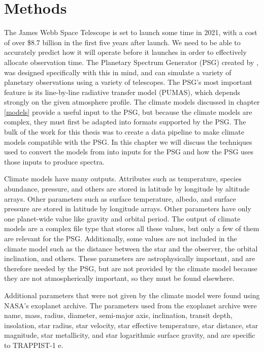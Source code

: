 \chapter{Methods}
\label{methods}
The James Webb Space Telescope is set to launch some time in 2021, with a
 cost of over \$8.7 billion in the first five years after launch. We need to be
 able to accurately predict how it will operate before it
 launches in order to effectively allocate observation time.
 The Planetary Spectrum Generator (PSG) created by \citet{psgpaper}, was
 designed specifically with this in
 mind, and can simulate a variety of planetary observations using a variety of
 telescopes. The PSG's most important feature is its line-by-line radiative
 transfer model (PUMAS), which depends strongly on the given atmosphere profile.
 The climate models discussed in chapter \ref{models} provide a useful input to
 the PSG, but because the climate models are complex, they must first be
 adapted
 into formats supported by the PSG. The bulk of the work for this thesis was to
 create a data pipeline to make climate models compatible with the PSG. In
 this chapter we will discuss the techniques used to convert the models from
 \citet{wolf17, wolf18} into inputs for the PSG and how the PSG uses those
 inputs to produce spectra.

Climate models have many outputs. Attributes such as temperature, species abundance,
 pressure, and others are stored in latitude by longitude by altitude arrays.
 Other parameters such as surface temperature, albedo, and surface pressure are
 stored in latitude by longitude arrays. Other parameters have only one
 planet-wide value like gravity and orbital period. The output of climate models
 are a
 complex file type that stores all these values, but only a few of them are
 relevant for the PSG. Additionally, some values are not included in the climate
 model such as the distance between the star and the observer, the orbital
 inclination, and others. These parameters are astrophysically important, and
 are therefore needed by the PSG, but are not provided by the climate model
 because they are not atmospherically important, so they must be found elsewhere.

Additional parameters that were not given by the climate model were found using
 NASA's exoplanet archive. The parameters used from the exoplanet archive were
 name, mass, radius, diameter, semi-major axis, inclination, transit depth,
 insolation, star radius, star velocity, star effective temperature, star
 distance,  star magnitude, star metallicity, and star logarithmic surface
 gravity, and are specific to TRAPPIST-1 e.

